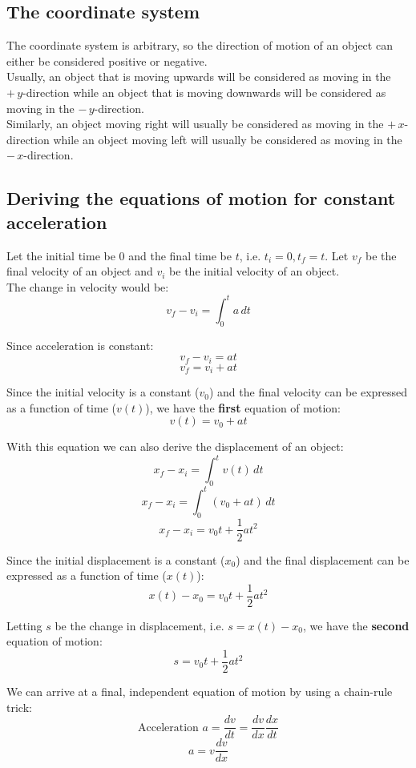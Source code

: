 \documentclass[11pt]{article}
\begin{document}
\subsection{The coordinate system}
\label{sec:orgd38fdd0}
The coordinate system is arbitrary, so the direction of motion of an object can either be considered positive or negative.
\\[0pt]

Usually, an object that is moving upwards will be considered as moving in the \(+ \, y\)-direction while an object that is moving downwards will be considered as moving in the \(- \, y\)-direction.
\\[0pt]

Similarly, an object moving right will usually be considered as moving in the \(+ \, x\)-direction while an object moving left will usually be considered as moving in the \(- \, x\)-direction.


\subsection{Deriving the equations of motion for constant acceleration}
\label{sec:orgb6ff998}
Let the initial time be 0 and the final time be \(t\), i.e. \(t_i = 0, t_f = t\). Let \(v_f\) be the final velocity of an object and \(v_i\) be the initial velocity of an object.
\\[0pt]

The change in velocity would be:
\[v_f - v_i = \int_0^t a \, dt\]

Since acceleration is constant:
\[v_f - v_i = at\]
\[v_f = v_i + at\]

Since the initial velocity is a constant (\(v_0\)) and the final velocity can be expressed as a function of time (\(v(t)\)), we have the \textbf{first} equation of motion:
\[v(t) = v_0 + at \tag{1}\]

With this equation we can also derive the displacement of an object:
\[x_f - x_i = \int_0^t v(t) \, dt\]
\[x_f - x_i = \int_0^t (v_0 + at) \, dt\]
\[x_f - x_i = v_0t + \frac{1}{2}at^2\]

Since the initial displacement is a constant (\(x_0\)) and the final displacement can be expressed as a function of time (\(x(t)\)):
\[x(t) - x_0 = v_0t + \frac{1}{2}at^2\]

Letting \(s\) be the change in displacement, i.e. \(s = x(t) - x_0\), we have the \textbf{second} equation of motion:
\[s = v_0t + \frac{1}{2}at^2 \tag{2}\]

We can arrive at a final, independent equation of motion by using a chain-rule trick:
\[\text{Acceleration } a = \frac{dv}{dt} = \frac{dv}{dx} \frac{dx}{dt}\]
\[a = v \frac{dv}{dx}\]
\end{document}
